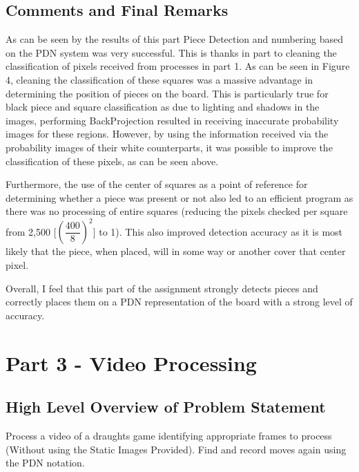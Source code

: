 \documentclass[12pt]{article}
\begin{document}
    \subsection{Comments and Final Remarks}
    \par
    As can be seen by the results of this part Piece Detection and numbering based on the PDN system was very successful. This is thanks in part to cleaning the classification of pixels received
    from processes in part 1. As can be seen in Figure 4, cleaning the classification of these squares was a massive advantage in determining the position of pieces on the board. This is particularly
    true for black piece and square classification as due to lighting and shadows in the images, performing BackProjection resulted in receiving inaccurate probability images for these regions. However, by
    using the information received via the probability images of their white counterparts, it was possible to improve the classification of these pixels, as can be seen above.
    \par
    Furthermore, the use of the center of squares as a point of reference for determining whether a piece was present or not also led to an efficient program as there was no processing of entire squares 
    (reducing the pixels checked per square from 2,500 [\((\dfrac{400}{8})^2\)] to 1). This also improved detection accuracy as it is most likely that the piece, when placed, will in some way or another cover 
    that center pixel.
    \par
    Overall, I feel that this part of the assignment strongly detects pieces and correctly places them on a PDN representation of the board with a strong level of accuracy. 

    \newpage
    \section{Part 3 - Video Processing}
    \subsection{High Level Overview of Problem Statement}
    \par
    Process a video of a draughts game identifying appropriate frames to process (Without using the Static Images Provided). Find and record moves again using the PDN notation.
\end{document}
